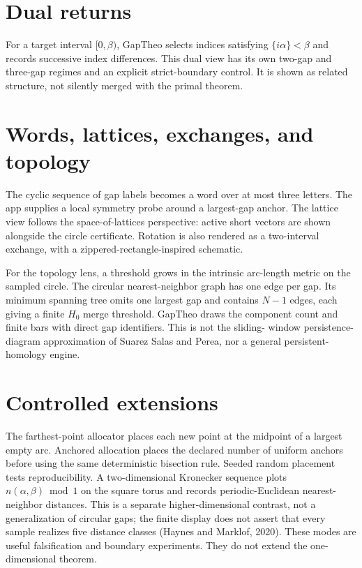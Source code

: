 \documentclass[11pt]{article}
\begin{document}
\section{Dual returns}
For a target interval $[0,\beta)$, GapTheo selects indices satisfying
$\{i\alpha\}<\beta$ and records successive index differences. This dual
view has its own two-gap and three-gap regimes and an explicit strict-boundary
control. It is shown as related structure, not silently merged with the
primal theorem.

\section{Words, lattices, exchanges, and topology}
The cyclic sequence of gap labels becomes a word over at most three letters.
The app supplies a local symmetry probe around a largest-gap anchor. The
lattice view follows the space-of-lattices perspective: active short vectors
are shown alongside the circle certificate. Rotation is also rendered as a
two-interval exchange, with a zippered-rectangle-inspired schematic.

For the topology lens, a threshold grows in the intrinsic arc-length metric
on the sampled circle. The circular nearest-neighbor graph has one edge per
gap. Its minimum spanning tree omits one largest gap and contains $N-1$
edges, each giving a finite $H_0$ merge threshold. GapTheo draws the component
count and finite bars with direct gap identifiers. This is not the sliding-
window persistence-diagram approximation of Suarez Salas and Perea, nor a
general persistent-homology engine.

\section{Controlled extensions}
The farthest-point allocator places each new point at the midpoint of a
largest empty arc. Anchored allocation places the declared number of uniform
anchors before using the same deterministic bisection rule. Seeded random
placement tests reproducibility. A
two-dimensional Kronecker sequence plots $n(\alpha,\beta)\bmod 1$ on the
square torus and records periodic-Euclidean nearest-neighbor distances. This is
a separate higher-dimensional contrast, not a generalization of circular gaps;
the finite display does not assert that every sample realizes five distance
classes (Haynes and Marklof, 2020).
These modes are useful falsification and boundary experiments. They do not
extend the one-dimensional theorem.
\end{document}
